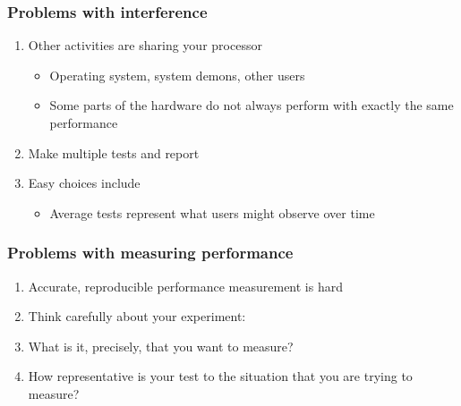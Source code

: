 \documentclass{beamer}
\begin{document}
\begin{frame}
\frametitle{Problems with interference}

\begin{enumerate}
\item Other activities are sharing your processor
\begin{itemize}

  \item Operating system, system demons, other users

  \item Some parts of the hardware do not always perform with exactly the same performance

\end{itemize}

\noindent
\item Make multiple tests and report

\item Easy choices include
\begin{itemize}

  \item Average tests represent what users might observe over time
\end{itemize}

\noindent
\end{enumerate}

\noindent
\end{frame}

\begin{frame}
\frametitle{Problems with measuring performance}

\begin{enumerate}
\item Accurate, reproducible performance measurement is hard

\item Think carefully about your experiment:

\item What is it, precisely, that you want to measure?

\item How representative is your test to the situation that you are trying to measure?
\end{enumerate}

\noindent
\end{frame}
\end{document}
